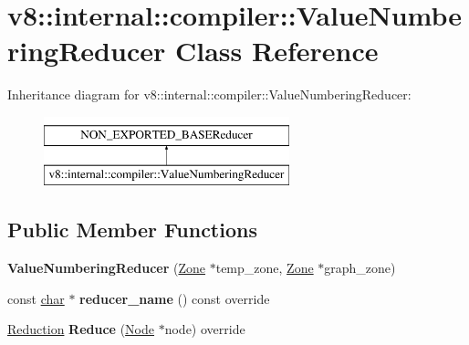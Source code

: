 \hypertarget{classv8_1_1internal_1_1compiler_1_1ValueNumberingReducer}{}\section{v8\+:\+:internal\+:\+:compiler\+:\+:Value\+Numbering\+Reducer Class Reference}
\label{classv8_1_1internal_1_1compiler_1_1ValueNumberingReducer}
Inheritance diagram for v8\+:\+:internal\+:\+:compiler\+:\+:Value\+Numbering\+Reducer\+:\begin{figure}[H]
\begin{center}
\leavevmode
\includegraphics[height=2.000000cm]{classv8_1_1internal_1_1compiler_1_1ValueNumberingReducer}
\end{center}
\end{figure}
\subsection*{Public Member Functions}
\begin{DoxyCompactItemize}
\item 
\mbox{\label{classv8_1_1internal_1_1compiler_1_1ValueNumberingReducer_aca924daf4a7bb79ed96ed7412656aee5}} 
{\bfseries Value\+Numbering\+Reducer} (\mbox{\hyperlink{classv8_1_1internal_1_1Zone}{Zone}} $\ast$temp\+\_\+zone, \mbox{\hyperlink{classv8_1_1internal_1_1Zone}{Zone}} $\ast$graph\+\_\+zone)
\item 
\mbox{\label{classv8_1_1internal_1_1compiler_1_1ValueNumberingReducer_a206c91aadda4670f38a9ffc0b3e35088}} 
const \mbox{\hyperlink{classchar}{char}} $\ast$ {\bfseries reducer\+\_\+name} () const override
\item 
\mbox{\label{classv8_1_1internal_1_1compiler_1_1ValueNumberingReducer_a3f49dd1deee724ec21fce3cd9c38b38a}} 
\mbox{\hyperlink{classv8_1_1internal_1_1compiler_1_1Reduction}{Reduction}} {\bfseries Reduce} (\mbox{\hyperlink{classv8_1_1internal_1_1compiler_1_1Node}{Node}} $\ast$node) override
\end{DoxyCompactItemize}


